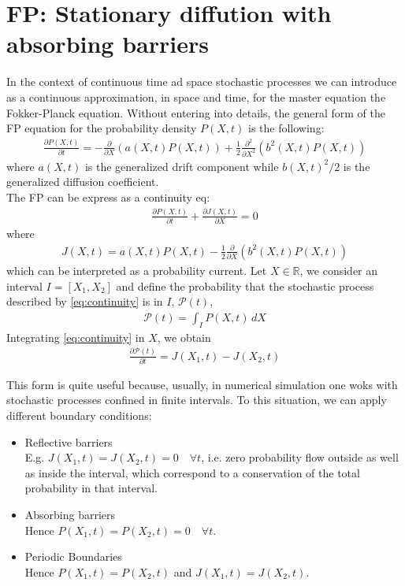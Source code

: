 \documentclass[4apaper,11pt,fleqn]{article}
\theoremstyle{remark}
\theoremstyle{definition}
\begin{document}
\section{FP: Stationary diffution with absorbing barriers}
In the context of continuous time ad space stochastic processes we can introduce as a continuous approximation, in space and time, for the master equation the Fokker-Planck equation.
Without entering into details, the general form of the FP equation for the probability density $P(X,t)$ is the following:
\begin{align*}
  \frac{\partial P(X, t)}{\partial t}=-\frac{\partial}{\partial X}(a(X, t) P(X, t))+\frac{1}{2} \frac{\partial^{2}}{\partial X^{2}}\left(b^{2}(X, t) P(X, t)\right)
\end{align*}
where $a(X,t)$ is the generalized drift component while $b(X,t)^2/2$ is the generalized diffusion coefficient.\\
The FP can be express as a continuity eq:
\begin{align}
  \label{eq:continuity}
  \frac{\partial P(X, t)}{\partial t}+\frac{\partial J(X, t)}{\partial X}=0
\end{align}
where
\begin{align*}
  J(X, t)=a(X, t) P(X, t)-\frac{1}{2} \frac{\partial}{\partial X}\left(b^{2}(X, t) P(X, t)\right)
\end{align*}
which can be interpreted as a probability current.
Let $X \in \mathbb{R}$, we consider an interval $I=[X_1,X_2]$ and define the probability that the stochastic process described by \eqref{eq:continuity} is in $I$, $\mathcal{P}(t)$,
\begin{align*}
  \mathcal{P}(t) = \int_I P(X,t) \, dX
\end{align*}
Integrating \eqref{eq:continuity} in $X$, we obtain
\begin{align*}
  \frac{\partial \mathcal{P}(t)}{\partial t}=J\left(X_{1}, t\right)-J\left(X_{2}, t\right)
\end{align*}

This form is quite useful because, usually, in numerical simulation one woks with stochastic processes confined in finite intervals. To this situation, we can apply different boundary conditions:
\begin{itemize}[leftmargin=*]
  \item Reflective barriers\\
  E.g. $J(X_1,t)=J(X_2,t)=0 \quad \forall t$, i.e. zero probability flow outside as well as inside the interval, which correspond to a conservation of the total probability in that interval.
  \item Absorbing barriers\\
  Hence $P(X_1,t) = P(X_2,t) = 0 \quad \forall t$.
  \item Periodic Boundaries\\
  Hence $P(X_1,t) = P(X_2,t)$ and $J(X_1,t)=J(X_2,t)$.
\end{itemize}
\end{document}
